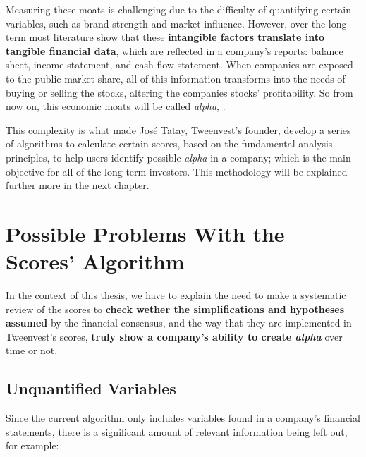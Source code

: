 \documentclass[11pt,english,a4paper,hidelinks]{book}
\begin{document}
\vspace{0.5cm}
\noindent Measuring these moats is challenging due to the difficulty of quantifying certain variables, such as brand strength and market influence. However, over the long term most literature show that these \textbf{intangible factors translate into tangible financial data}, which are reflected in a company's reports: balance sheet, income statement, and cash flow statement. When companies are exposed to the public market share, all of this information transforms into the needs of buying or selling the stocks, altering the companies stocks' profitability. So from now on, this economic moats will be called \textit{alpha}, \textcite{sharpe1964capm}.

\vspace{0.5cm}
\noindent This complexity is what made José Tatay, Tweenvest's founder, develop a series of algorithms to calculate certain scores, based on the fundamental analysis principles, to help users identify possible \textit{alpha} in a company; which is the main objective for all of the long-term investors. This methodology will be explained further more in the next chapter.

\section{Possible Problems With the Scores' Algorithm}

\noindent In the context of this thesis, we have to explain the need to make a systematic review of the scores to \textbf{check wether the simplifications and hypotheses assumed} by the financial consensus, and the way that they are implemented in Tweenvest's scores, \textbf{truly show a company's ability to create \textit{alpha}} over time or not.


\subsection{Unquantified Variables}
\noindent Since the current algorithm only includes variables found in a company's financial statements, there is a significant amount of relevant information being left out, for example:
\end{document}
